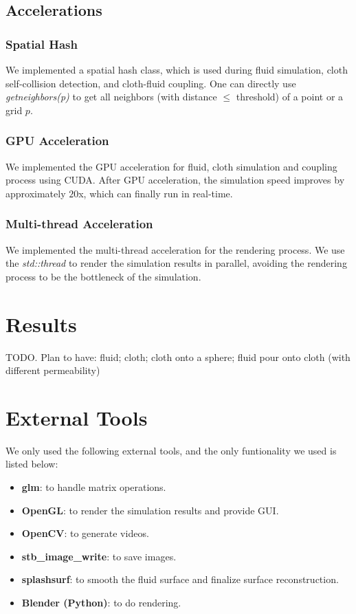 \subsection{Accelerations}

\subsubsection{Spatial Hash} We implemented a spatial hash class, which is used during fluid simulation, cloth self-collision detection, and cloth-fluid coupling. One can directly use \textit{getneighbors(p)} to get all neighbors (with distance $\le $ threshold) of a point or a grid $p$.

\subsubsection{GPU Acceleration} We implemented the GPU acceleration for fluid, cloth simulation and coupling process using CUDA. After GPU acceleration, the simulation speed improves by approximately $20$x, which can finally run in real-time.

\subsubsection{Multi-thread Acceleration} We implemented the multi-thread acceleration for the rendering process. We use the \textit{std::thread} to render the simulation results in parallel, avoiding the rendering process to be the bottleneck of the simulation.

\section{Results}

TODO. Plan to have: fluid; cloth; cloth onto a sphere; fluid pour onto cloth (with different permeability)

\section{External Tools}

We only used the following external tools, and the only funtionality we used is listed below:

\begin{itemize}
\item \textbf{glm}: to handle matrix operations.
\item \textbf{OpenGL}: to render the simulation results and provide GUI.
\item \textbf{OpenCV}: to generate videos.
\item \textbf{stb\_image\_write}: to save images.
\item \textbf{splashsurf}: to smooth the fluid surface and finalize surface reconstruction.
\item \textbf{Blender (Python)}: to do rendering.
\end{itemize}

